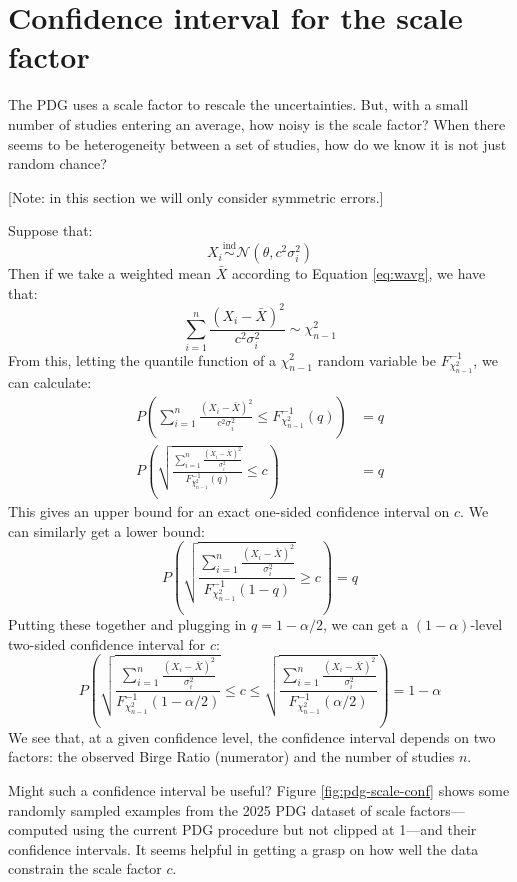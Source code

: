\documentclass[12pt]{article}
\begin{document}
\FloatBarrier
\section{Confidence interval for the scale factor}

The PDG uses a scale factor to rescale the uncertainties. But, with a small number of studies entering an average, how noisy is the scale factor? When there seems to be heterogeneity between a set of studies, how do we know it is not just random chance?

[Note: in this section we will only consider symmetric errors.]

Suppose that:
\begin{equation}\label{eq:birgemodel}
X_i\overset{\mathrm{ind}}\sim \mathcal{N}(\theta,c^2\sigma_i^2)
\end{equation}
Then if we take a weighted mean $\bar{X}$ according to Equation \ref{eq:wavg}, we have that:
\[\sum_{i=1}^n\frac{(X_i-\bar{X})^2}{c^2\sigma_i^2} \sim \chi^2_{n-1}\]
From this, letting the quantile function of a $\chi^2_{n-1}$ random variable be $F^{-1}_{\chi^2_{n-1}}$, we can calculate:
\begin{align*}
P\left(\sum_{i=1}^n\frac{(X_i-\bar{X})^2}{c^2\sigma_i^2}\leq F^{-1}_{\chi^2_{n-1}}(q)\right)&=q\\
P\left(\sqrt{\frac{\sum_{i=1}^n\frac{(X_i-\bar{X})^2}{\sigma_i^2}}{F^{-1}_{\chi^2_{n-1}}(q)}}\leq c\right)&=q
\end{align*}
This gives an upper bound for an exact one-sided confidence interval on $c$. We can similarly get a lower bound:
\[P\left(\sqrt{\frac{\sum_{i=1}^n\frac{(X_i-\bar{X})^2}{\sigma_i^2}}{F^{-1}_{\chi^2_{n-1}}(1-q)}}\geq c\right)=q\]
Putting these together and plugging in $q=1-\alpha/2$, we can get a $(1-\alpha)$-level two-sided confidence interval for $c$:
\[P\left(\sqrt{\frac{\sum_{i=1}^n\frac{(X_i-\bar{X})^2}{\sigma_i^2}}{F^{-1}_{\chi^2_{n-1}}(1-\alpha/2)}}\leq c\leq \sqrt{\frac{\sum_{i=1}^n\frac{(X_i-\bar{X})^2}{\sigma_i^2}}{F^{-1}_{\chi^2_{n-1}}(\alpha/2)}}\right)=1-\alpha\]
We see that, at a given confidence level, the confidence interval depends on two factors: the observed Birge Ratio (numerator) and the number of studies $n$.

Might such a confidence interval be useful? Figure \ref{fig:pdg-scale-conf} shows some randomly sampled examples from the 2025 PDG dataset of scale factors---computed using the current PDG procedure but not clipped at 1---and their confidence intervals. It seems helpful in getting a grasp on how well the data constrain the scale factor $c$.
\end{document}
